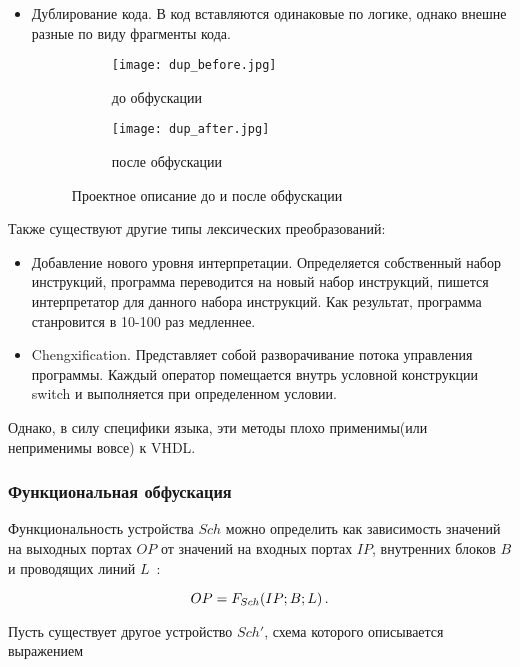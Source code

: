 \begin{itemize}
\item Дублирование кода. В код вставляются одинаковые по логике, однако внешне разные по виду фрагменты кода.


\begin{figure}[ht]
\centering
  \begin{subfigure}[b]{0.45\textwidth}
    \centering
    \texttt{[image: dup\_before.jpg]}
    \caption*{до обфускации}
  \end{subfigure}
  \begin{subfigure}[b]{0.45\textwidth}
    \centering
    \texttt{[image: dup\_after.jpg]}
    \caption*{после обфускации}
  \end{subfigure}
  \caption{ Проектное описание до и после обфускации}
  \label{fig:fire_alarms}
\end{figure}

\end{itemize}

Также существуют другие типы лексических преобразований:
\begin{itemize}
\item Добавление нового уровня интерпретации. Определяется собственный набор инструкций, программа переводится на новый набор инструкций, пишется интерпретатор для данного набора инструкций. Как результат, программа станровится в 10-100 раз медленнее.
\item Chengxification. Представляет собой разворачивание потока управления программы. Каждый оператор помещается внутрь условной конструкции switch и выполняется при определенном условии.
\end{itemize}
Однако, в силу специфики языка, эти методы плохо применимы(или неприменимы вовсе) к VHDL.

\subsubsection{Функциональная обфускация}

Функциональность устройства $Sch$ можно определить как зависимость значений на выходных портах $OP$ от значений на входных портах $IP$, внутренних блоков $B$ и проводящих линий $L$~\cite{ivaniuk}:

\begin{equation}
  OP = F_{Sch} (IP;B;L) \text{\,.}
  \label{eq:domain:functional:basis}
\end{equation}

Пусть существует другое устройство $Sch'$, схема которого описывается выражением

